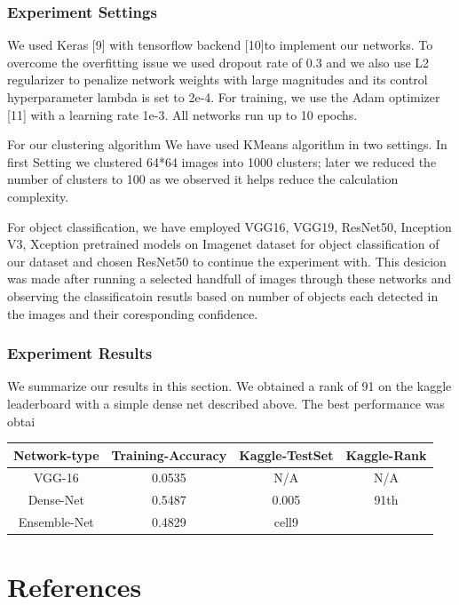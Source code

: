 \documentclass{article}
\begin{document}
\subsubsection{Experiment Settings}
We used Keras [9] with tensorflow backend [10]to implement our networks. To overcome the overfitting issue we used dropout rate of 0.3 and we also use L2 regularizer to penalize network
weights with large magnitudes and its control hyperparameter  lambda is set to
2e-4. For training, we use the Adam optimizer [11] with a learning rate 1e-3. All
networks run up to 10 epochs.

For our clustering algorithm We have used KMeans algorithm in two settings. In first Setting we clustered 64*64 images into 1000 clusters; later we reduced the number of clusters to 100 as we observed it helps reduce the calculation complexity.

For object classification, we have employed VGG16, VGG19, ResNet50, Inception V3, Xception pretrained models on Imagenet dataset for object classification of our dataset and chosen ResNet50 to continue the experiment with. This desicion was made after running a selected handfull of images through these networks and observing the classificatoin resutls based on number of objects each detected in the images and their coresponding confidence.

\subsubsection{Experiment Results}

We summarize our results in this section. We obtained a rank of 91 on the kaggle leaderboard with a simple dense net described above.
The best performance was obtai
\begin{table}[t]
	\begin{center}
		\begin{tabular}{ |c|c|c|c| } 
			\hline
			Network-type & Training-Accuracy & Kaggle-TestSet &Kaggle-Rank\\ 
			\hline
			VGG-16 & 0.0535 & N/A & N/A \\ 
			Dense-Net & 0.5487 & 0.005&91th \\ 
			Ensemble-Net& 0.4829 & cell9 \\ 
			\hline
		\end{tabular}
	\end{center}
\end{table}


\section*{References}
\end{document}
